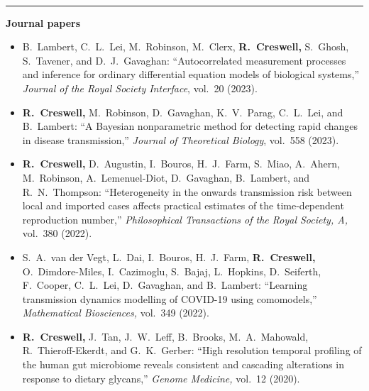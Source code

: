 \documentclass[10pt]{article}
\begin{document}
\vspace{-2.75mm} \\
\rule{\textwidth}{0.4pt}
\vspace*{.5cm}
\noindent\textbf{Journal papers}
\begin{itemize}[leftmargin=*]
\setlength{\itemsep}{4pt}
\setlength{\parskip}{0pt}
\setlength{\parsep}{0pt}
\vspace*{-.5cm}

\item {\color{gray}B.\ Lambert, C.\ L.\ Lei, M.\ Robinson, M.\ Clerx,} \textbf{R.\ Creswell,} {\color{gray} S.\ Ghosh, S.\ Tavener, and D.\ J.\ Gavaghan:} ``Autocorrelated measurement processes and inference for ordinary differential equation models of biological systems,'' \emph{Journal of the Royal Society Interface}, vol.\ 20 (2023).


\item \textbf{R.\ Creswell,} {\color{gray} M.\ Robinson, D.\ Gavaghan, K.\ V.\ Parag, C.\ L.\ Lei, and B.\ Lambert:} ``A Bayesian nonparametric method for detecting rapid changes in disease transmission,'' \emph{Journal of Theoretical Biology}, vol.\ 558 (2023).

\item \textbf{R.\ Creswell,\textsuperscript{\dag}} {\color{gray}D.\ Augustin,\textsuperscript{\dag} I.\ Bouros,\textsuperscript{\dag} H.\ J.\ Farm,\textsuperscript{\dag} S.\ Miao,\textsuperscript{\dag} A.\ Ahern,\textsuperscript{\dag} M.\ Robinson, A.\ Lemenuel-Diot, D.\ Gavaghan, B.\ Lambert, and R.\ N.\ Thompson:} ``Heterogeneity in the onwards transmission risk between local and imported cases affects practical estimates of the time-dependent reproduction number,'' \emph{Philosophical Transactions of the Royal Society, A,} vol.\ 380 (2022).

\item {\color{gray} S.\ A.\ van der Vegt,\textsuperscript{\dag} L.\ Dai,\textsuperscript{\dag} I.\ Bouros,\textsuperscript{\dag} H.\ J.\ Farm,\textsuperscript{\dag} \textbf{\color{black}R.\ Creswell,\textsuperscript{\dag}} O.\ Dimdore-Miles,\textsuperscript{\dag} I.\ Cazimoglu, S.\ Bajaj, L.\ Hopkins, D.\ Seiferth, F.\ Cooper, C.\ L.\ Lei, D.\ Gavaghan, and B.\ Lambert:} ``Learning transmission dynamics modelling of COVID-19 using comomodels,'' \emph{Mathematical Biosciences,} vol.\ 349 (2022).

\item \textbf{R.\ Creswell,\textsuperscript{\dag}} {\color{gray}J.\ Tan,\textsuperscript{\dag} J.\ W.\ Leff, B.\ Brooks, M.\ A.\ Mahowald, R.\ Thieroff-Ekerdt, and G.\ K.\ Gerber:} ``High resolution temporal profiling of the human gut microbiome reveals consistent and cascading alterations in response to dietary glycans,'' \emph{Genome Medicine,} vol.\ 12 (2020).


\end{itemize}
\end{document}
